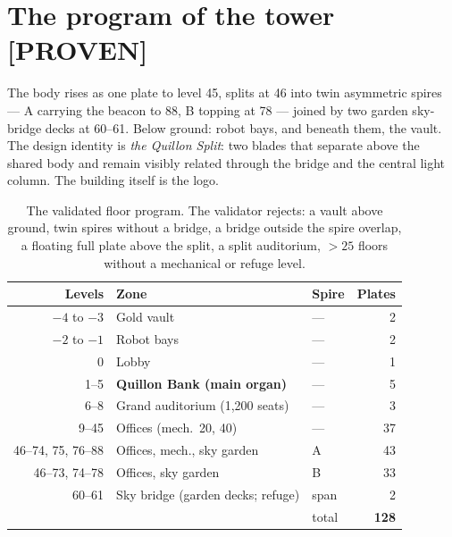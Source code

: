 \documentclass[11pt,a4paper]{article}
\newcommand{\claim}[1]{\textcolor{qsteel}{\textbf{\footnotesize[#1]}}}
\begin{document}
\section{The program of the tower \hfill \claim{PROVEN}}

The body rises as one plate to level 45, splits at 46 into twin asymmetric
spires --- A carrying the beacon to 88, B topping at 78 --- joined by two garden
sky-bridge decks at 60--61. Below ground: robot bays, and beneath them, the vault.
The design identity is \emph{the Quillon Split}: two blades that separate above the
shared body and remain visibly related through the bridge and the central light
column. The building itself is the logo.

\begin{center}
\end{center}

\begin{table}[h]\centering\small
\begin{tabular}{@{}rllr@{}}
\toprule
Levels & Zone & Spire & Plates \\
\midrule
$-4$ to $-3$ & Gold vault & --- & 2 \\
$-2$ to $-1$ & Robot bays & --- & 2 \\
0 & Lobby & --- & 1 \\
1--5 & \textbf{Quillon Bank (main organ)} & --- & 5 \\
6--8 & Grand auditorium (1{,}200 seats) & --- & 3 \\
9--45 & Offices (mech.\ 20, 40) & --- & 37 \\
46--74, 75, 76--88 & Offices, mech., sky garden & A & 43 \\
46--73, 74--78 & Offices, sky garden & B & 33 \\
60--61 & Sky bridge (garden decks; refuge) & span & 2 \\
\midrule
 & & total & \textbf{128} \\
\bottomrule
\end{tabular}
\caption{The validated floor program. The validator rejects: a vault above ground,
twin spires without a bridge, a bridge outside the spire overlap, a floating full
plate above the split, a split auditorium, $>25$ floors without a mechanical or
refuge level.}
\end{table}
\end{document}

